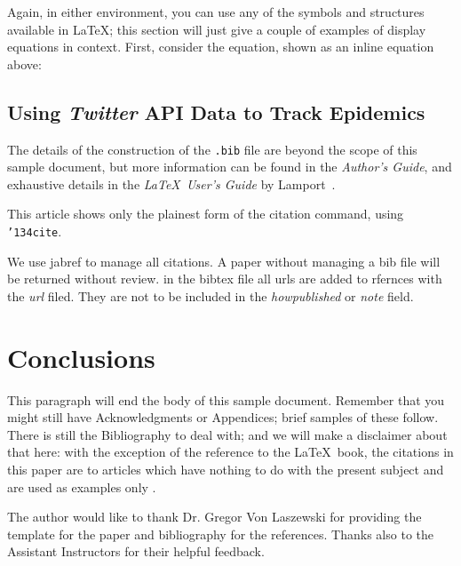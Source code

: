 \documentclass[sigconf]{acmart}
\begin{document}
Again, in either environment, you can use any of the symbols
and structures available in \LaTeX\@; this section will just
give a couple of examples of display equations in context.
First, consider the equation, shown as an inline equation above:


\subsection{Using {\itshape Twitter} API Data to Track Epidemics}

The details of the construction of the \texttt{.bib} file are beyond
the scope of this sample document, but more information can be found
in the \textit{Author's Guide}, and exhaustive details in the
\textit{\LaTeX\ User's Guide} by Lamport~.

This article shows only the plainest form of the citation command,
using \texttt{{\char'134}cite}.

We use jabref to manage all citations. A paper without managing a bib
file will be returned without review. in the bibtex file all urls are
added to rfernces with the {\it url} filed. They are not to be
included in the {\it howpublished} or {\it note} field. 



\section{Conclusions}

This paragraph will end the body of this sample document.  Remember
that you might still have Acknowledgments or Appendices; brief samples
of these follow.  There is still the Bibliography to deal with; and we
will make a disclaimer about that here: with the exception of the
reference to the \LaTeX\ book, the citations in this paper are to
articles which have nothing to do with the present subject and are
used as examples only \cite{Paul2014}.


\begin{acks}

  The author would like to thank Dr. Gregor Von Laszewski for providing the 
  \LaTex template for the paper and \JabRef bibliography for the references. 
  Thanks also to the Assistant Instructors for their helpful feedback.

\end{acks}


 
\end{document}
